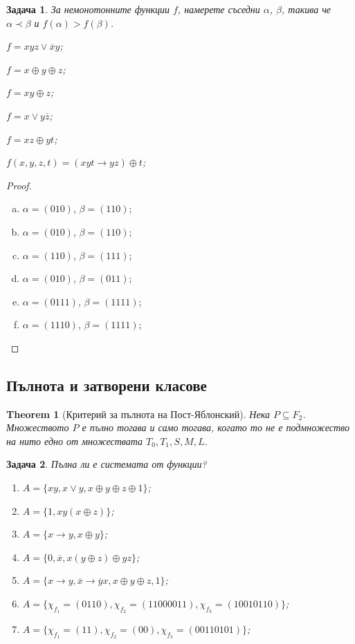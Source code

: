 \documentclass[a4paper]{article}
\newtheorem{thm}{Theorem}
\newtheorem{problem}{Задача}
\newcommand{\ov}[1]{\overline{#1}}
\begin{document}
\begin{problem}
  За немонотонните функции $f$, намерете съседни $\alpha$, $\beta$, такива че
  $\alpha \prec \beta$ и $f(\alpha) > f(\beta)$.\\
  \begin{inparaenum}[a)]
  \item
    $f = xyz \vee \ov{x}y$;
  \item
    $f = x\oplus y\oplus z$;
  \item
    $f = xy\oplus z$;
  \item
    $f = x\vee y\ov{z}$;
  \item
    $f = xz\oplus yt$;
  \item
    $f(x,y,z,t) = (xyt\rightarrow yz)\oplus t$;
  \end{inparaenum}
\end{problem}
\begin{proof}
  \begin{enumerate}[a)]
  \item
    $\alpha = (010)$, $\beta = (110)$;
  \item
    $\alpha = (010)$, $\beta = (110)$;
  \item
    $\alpha = (110)$, $\beta = (111)$;
  \item
    $\alpha = (010)$, $\beta = (011)$;
  \item
    $\alpha = (0111)$, $\beta = (1111)$;
  \item
    $\alpha = (1110)$, $\beta = (1111)$;
  \end{enumerate}
\end{proof}



\subsection{Пълнота и затворени класове}

\begin{thm}[Критерий за пълнота на Пост-Яблонский]
  Нека $P\subseteq F_2$. Множеството $P$ е пълно тогава и само тогава, когато то {\em не} е подмножество на 
  нито едно от множествата $T_0,T_1,S,M,L$.
\end{thm}


\begin{problem} %
  Пълна ли е системата от функции?
  \begin{enumerate}[1)]
  \item
    $A = \{xy, x\vee y, x\oplus y\oplus z\oplus 1\}$;
  \item
    $A = \{1, xy(x\oplus z)\}$;
  \item
    $A = \{x\rightarrow y, x\oplus y\}$;
  \item
    $A = \{0, \ov{x}, x(y\oplus z)\oplus yz\}$;
  \item
    $A = \{x\rightarrow y, \ov{x}\rightarrow \ov{y}x, x\oplus y\oplus z, 1\}$;
  \item
    $A = \{\chi_{f_1} = (0110), \chi_{f_2} = (1100 0011), \chi_{f_3} = (1001 0110)\}$;
  \item
    $A = \{\chi_{f_1} = (11), \chi_{f_2} = (00), \chi_{f_3} = (0011 0101)\}$;
  \end{enumerate}
\end{problem}
\end{document}
